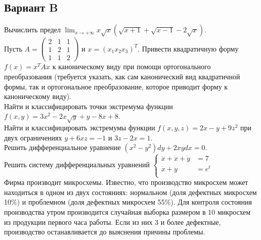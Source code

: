 \documentclass[addpoints, answers]{exam} %
\begin{document}
\subsection{Вариант B}
\begin{questions}
\question Вычислить предел $\lim_{x\to +\infty} x \sqrt{x}(\sqrt{x+1}+\sqrt{x-1}-2\sqrt{x})$.\\
\question  Пусть $A=
\left(\begin{array}{ccc}
2 & 1 & 1\\
1 & 2 & 1\\
1 & 1 & 2
\end{array}\right)$ и $x=(x_1 x_2 x_3)^T$. Привести квадратичную форму $f(x)=x^T Ax$ к каноническому виду при помощи ортогонального преобразования (требуется указать, как сам канонический вид квадратичной формы, так и ортогональное преобразование, которое приводит форму к каноническому виду).\\
\question  Найти и классифицировать точки экстремума функции $f(x,y)=3x^2-2x\sqrt{y}+y-8x+8$.\\
\question  Найти и классифицировать экстремумы функции $f(x,y,z)=2x-y+9z^2$ при двух ограничениях $y+6xz=-1$ и $3z-2x=1$.\\
\question  Решить дифференциальное уравнение $(x^2-y^2)dy + 2xydx=0$.\\
\question  Решить систему дифференциальных уравнений 
$\left\{
\begin{aligned}
\ddot{x}+\dot{x}+\dot{y} & = 7\\
\dot{x}+\ddot{y}         & = e^t\\
\end{aligned}\right.$\\
\question  Фирма производит микросхемы. Известно, что производство микросхем может находиться в одном из двух состояниях: нормальном (доля дефектных микросхем 10\%) и проблемном (доля дефектных микросхем 55\%). Для контроля состояния производства утром производится случайная выборка размером в 10 микросхем из продукции первого часа работы. Если из них 3 и более дефектные, производство останавливается до выяснения причины проблемы.
\end{questions}
\end{document}
